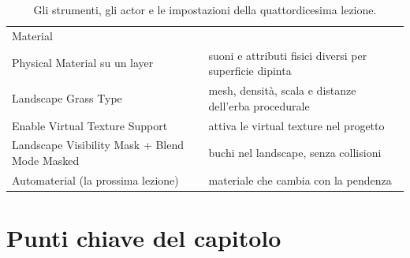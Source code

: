 \begin{table}[htbp]
\begin{tabular}{@{}p{5.8cm}p{8.2cm}@{}}
Material \\
Physical Material su un layer & suoni e attributi fisici diversi per superficie dipinta \\
Landscape Grass Type & mesh, densità, scala e distanze dell'erba procedurale \\
Enable Virtual Texture Support & attiva le virtual texture nel progetto \\
Landscape Visibility Mask + Blend Mode Masked & buchi nel landscape, senza collisioni \\
Automaterial (la prossima lezione) & materiale che cambia con la pendenza \\
\bottomrule
\end{tabular}
\caption{Gli strumenti, gli actor e le impostazioni della quattordicesima lezione.}
\label{ue14:tab:strumenti}
\end{table}

\section*{Punti chiave del capitolo}

